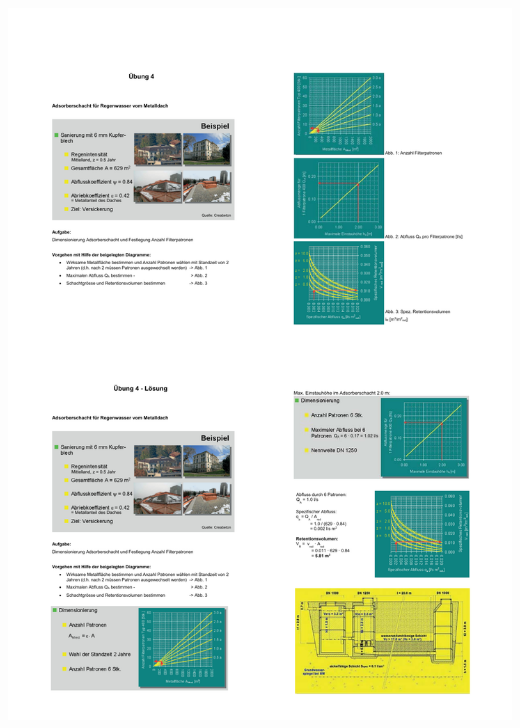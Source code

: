 \documentclass[9pt, openright=false]{scrartcl}
\begin{document}
\begin{center}
\includegraphics[width=\textwidth]{images/uebung4}
\end{center} 
\newpage
\end{document}

